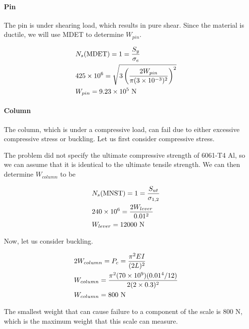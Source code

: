 \documentclass[
10pt,
a4paper,
openany,
svgnames,
]{book}
\begin{document}
\paragraph{Pin}
The pin is under shearing load, which results in pure shear. Since the material is ductile, we will use MDET to determine $W_{pin}$.

\[\begin{gathered}
  N_s\text{(MDET)} = 1 = \frac{S_y}{\sigma_e} \hfill \\
  425 \times 10^6 = \sqrt {3\left( \frac{2W_{pin}}{\pi (3 \times 10^{-3})^2} \right)^2}  \hfill \\
  W_{pin} = 9.23 \times 10^5\text{ N} \hfill \\ 
\end{gathered} \]

\paragraph{Column}

The column, which is under a compressive load, can fail due to either excessive compressive stress or buckling. Let us first consider compressive stress.

The problem did not specify the ultimate compressive strength of 6061-T4 Al, so we can assume that it is identical to the ultimate tensile strength. We can then determine $W_{column}$ to be

\[\begin{gathered}
  N_s\text{(MNST)} = 1 = \frac{S_{ut}}{\sigma_{1,2}} \hfill \\
  240 \times 10^6 = \frac{2W_{lever}}{0.01^2} \hfill \\
  W_{lever} = 12000\text{ N} \hfill \\ 
\end{gathered} \]

Now, let us consider buckling. 

\[\begin{gathered}
  2W_{column} = P_c = \frac{\pi ^2EI}{(2L)^2} \hfill \\
  W_{column} = \frac{\pi ^2(70 \times 10^9)(0.01^4/12)}{2(2 \times 0.3)^2} \hfill \\
  W_{column} = 800\text{ N} \hfill \\ 
\end{gathered} \]

The smallest weight that can cause failure to a component of the scale is 800 N, which is the maximum weight that this scale can measure.
\end{document}
